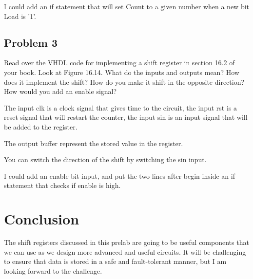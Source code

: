 \documentclass[11pt]{article}
\begin{document}
I could add an if statement that will set Count to a given number when a new bit Load is '1'.

\subsection{Problem 3}
Read over the VHDL code for implementing a shift register in section 16.2 of your book. Look at Figure 16.14. What do the inputs and outputs mean? How does it implement the shift? How do you make it shift in the opposite direction? How would you add an enable signal?

The input clk is a clock signal that gives time to the circuit, the input rst is a reset signal that will restart the counter, the input sin is an input signal that will be added to the register.

The output buffer represent the stored value in the register.

You can switch the direction of the shift by switching the sin input.

I could add an enable bit input, and put the two lines after begin inside an if statement that checks if enable is high.

\section{Conclusion}
The shift registers discussed in this prelab are going to be useful components that we can use as we design more advanced and useful circuits. It will be challenging to ensure that data is stored in a safe and fault-tolerant manner, but I am looking forward to the challenge.
\end{document}
